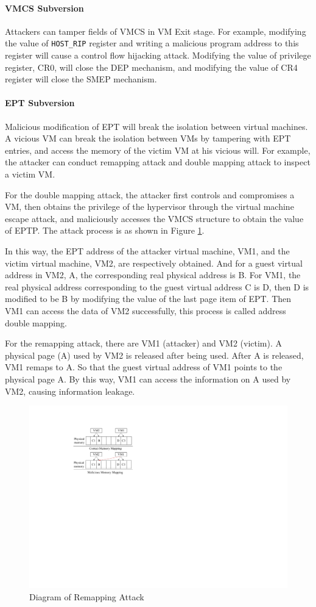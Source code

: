 \paragraph{VMCS Subversion}
Attackers can tamper fields of VMCS in VM Exit stage. For example, modifying the value of \verb|HOST_RIP| register and writing a malicious program address to this register will cause a control flow hijacking attack. Modifying the value of privilege register, CR0, will close the DEP mechanism, and modifying the value of CR4 register will close the SMEP mechanism.


\paragraph{EPT Subversion}
Malicious modification of EPT will break the isolation between virtual machines. A vicious VM can break the isolation between VMs by tampering with EPT entries, and access the memory of the victim VM at his vicious will. For example, the attacker can conduct remapping attack and double mapping attack to inspect a victim VM. 

For the double mapping attack, the attacker first controls and compromises a VM, then obtains the privilege of the hypervisor through the virtual machine escape attack, and maliciously accesses the VMCS structure to obtain the value of EPTP. The attack process is as shown in Figure \ref{pic:remap}. 

In this way, the EPT address of the attacker virtual machine, VM1, and the victim virtual machine, VM2, are respectively obtained. And for a guest virtual address in VM2, A, the corresponding real physical address is B. For VM1, the real physical address corresponding to the guest virtual address C is D, then D is modified to be B by modifying the value of the last page item of EPT. Then VM1 can access the data of VM2 successfully, this process is called address double mapping.

For the remapping attack, there are VM1 (attacker) and VM2 (victim). A physical page (A) used by VM2 is released after being used. After A is released, VM1 remaps to A. So that the guest virtual address of VM1 points to the physical page A. By this way, VM1 can access the information on A used by VM2, causing information leakage.


\begin{figure}
    \centering
    \includegraphics[width=0.8\linewidth]{IMG/remap.pdf}
    \caption{Diagram of Remapping Attack}
    \label{pic:remap}
\end{figure}

